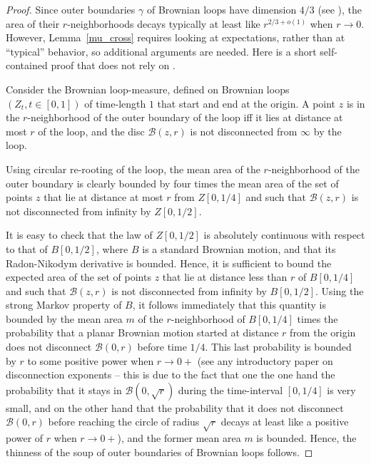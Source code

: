 \documentclass[11pt]{article}
\newcommand{\B}{{\mathcal B}}
\begin{document}
\begin {proof}
Since outer boundaries $\gamma$ of Brownian loops have dimension $4/3$ 
(see \cite {LSW2}),
the area of their $r$-neighborhoods decays typically at least like 
$r^{2/3+ o (1)}$ when $r \to 0$.
However, Lemma~\ref{mu_cross} requires looking at expectations, rather than
at ``typical'' behavior, so additional arguments are needed.
Here is a short self-contained proof that does not rely on \cite {LSW2}.

Consider the Brownian loop-measure, defined on
Brownian loops $(Z_t, t \in [0,1])$ 
of time-length $1$ that start and end at the origin. 
A point $z$ is in the $r$-neighborhood of the 
outer boundary of the loop iff it lies at distance at most $r$ of the loop, 
and the disc $\B (z,r)$ is not disconnected 
from $\infty$ by the loop.
 
Using circular re-rooting of the loop, the mean area of the $r$-neighborhood of the 
outer boundary is clearly bounded 
by four times the mean area of the set of points $z$ that lie at distance 
at most $r$ from $Z [0,1/4]$ and such that $\B(z,r)$ is not disconnected 
from infinity by $Z[0,1/2]$. 

It is easy to check that the law of $Z [0,1/2]$ is absolutely continuous with respect 
to that of $B [0,1/2]$, where $B$ is a standard Brownian motion, 
and that its Radon-Nikodym derivative is bounded. 
Hence, it is sufficient to bound the expected area of the set of points 
$z$ that lie at distance less than $r$ of $B [0,1/4]$ 
and such that $\B (z,r)$ is not disconnected from infinity by $B[0,1/2]$. 
Using the strong Markov property of $B$, it follows immediately that 
this quantity is bounded by the mean area $m$ of the $r$-neighborhood of $B[0,1/4]$ 
times the probability that a planar Brownian motion started at distance $r$ from the origin 
does not disconnect $\B(0,r)$ before time $1/4$. This last probability is bounded by $r$ 
to some positive power when $r \to 0+$ (see any introductory paper on disconnection exponents --
 this is due to the fact that one the one hand the probability that it stays in $\B (0, \sqrt {r})$
 during the time-interval $[0, 1/4]$ is very small, and on the other hand that the probability that 
it does not disconnect $\B (0,r)$ before reaching the circle of radius $\sqrt {r}$ decays at least 
like a positive power of $r$ when $r \to 0+$), 
and the former mean area $m$ is bounded. Hence, the thinness of the soup of 
outer boundaries of Brownian loops follows.   
\end {proof}
\end{document}
